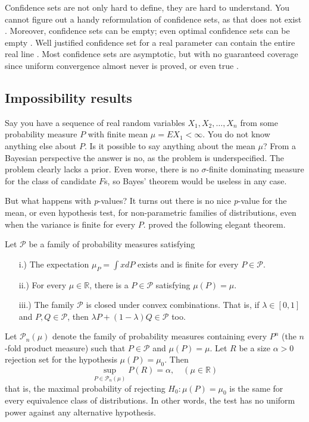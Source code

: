 Confidence sets are not only hard to define, they are hard to understand. You cannot figure out a handy reformulation of confidence sets, as that does not exist \parencite{Morey2016-ry}. Moreover, confidence sets can be empty; even optimal confidence sets can be empty \parencite[Section 3.1]{Blaker2000-ud}. Well justified confidence set for a real parameter can contain the entire real line \parencite[Section 3.2--3.3]{Blaker2000-ud}. Most confidence sets are asymptotic, but with no guaranteed coverage since uniform convergence almost never is proved, or even true \parencite{Gleser1996-kk}.

\subsection{Impossibility results}

Say you have a sequence of real random variables $X_{1},X_{2},\ldots,X_{n}$ from some probability measure $P$ with finite mean $\mu=EX_{1}<\infty$. You do not know anything else about $P$. Is it possible to say anything about the mean $\mu$? From a Bayesian perspective the answer is no, as the problem is underspecified. The problem clearly lacks a prior. Even worse, there is no $\sigma$-finite dominating measure for the class of candidate $F$s, so Bayes' theorem would be useless in any case. 

But what happens with \textit{p}-values? It turns out there is no nice \textit{p}-value for the mean, or even hypothesis test, for non-parametric families of distributions, even when the variance is finite for every $P$. \textcite{Bahadur1956-tg} proved the following elegant theorem.
\begin{theorem}\label{thm:bahadur-savage}
Let $\mathcal{\mathcal{P}}$ be a family of probability measures
satisfying
\begin{enumerate}
\item[i.)] The expectation $\mu_{P}=\int xdP$ exists and is finite for every
$P\in\mathcal{P}$.
\item[ii.)] For every $\mu\in\mathbb{R}$, there is a $P\in\mathcal{\mathcal{P}}$
satisfying $\mu(P)=\mu$.
\item[iii.)] The family $\mathcal{\mathcal{P}}$ is closed under convex combinations.
That is, if $\lambda\in[0,1]$ and $P,Q\in\mathcal{P}$, then $\lambda P+(1-\lambda)Q\in\mathcal{P}$
too.
\end{enumerate}
Let $\mathcal{P}_{n}(\mu)$ denote the family of probability measures
containing every $P^{n}$ (the $n$-fold product measure) such that $P\in\mathcal{P}$ and $\mu(P)=\mu$.
Let $R$ be a size $\alpha>0$ rejection set for the hypothesis $\mu(P)=\mu_{0}$.
Then 
\[
\sup_{P\in\mathcal{P}_{n}(\mu)}P(R)=\alpha,\quad(\mu\in\mathbb{R})
\]
that is, the maximal probability of rejecting $H_{0}:\mu(P)=\mu_{0}$
is the same for every equivalence class of distributions. In other words,
the test has no uniform power against any alternative hypothesis. 
\end{theorem}

